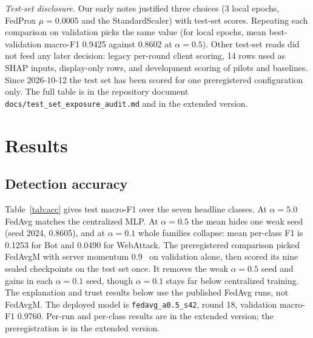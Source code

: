 \documentclass[conference]{IEEEtran}
\newif\iffullversion
\newcommand{\fullref}[1]{\iffullversion Appendix~\ref{#1}\else the extended version\fi}
\begin{document}
\emph{Test-set disclosure.} Our early notes justified three choices (3 local epochs, %
FedProx $\mu=0.0005$ and the StandardScaler) with test-set scores. Repeating each %
comparison on validation picks the same value (for local epochs, mean best-validation
macro-F1 0.9425 against 0.8602 at $\alpha=0.5$). Other test-set reads did not feed any %
later decision: legacy per-round client scoring, 14 rows used as SHAP inputs, %
display-only rows, and development scoring of pilots and baselines. Since 2026-10-12 the %
test set has been scored for one preregistered configuration only. The
full table is in the repository document \texttt{docs/test\_set\_exposure\_audit.md}
and in \fullref{app:testaudit}.

\section{Results}

\subsection{Detection accuracy}
\label{sec:r-acc}
Table~\ref{tab:acc} gives test macro-F1 over the seven headline classes. At
$\alpha=5.0$ FedAvg matches the centralized MLP. At $\alpha=0.5$ the mean hides one weak %
seed (seed 2024, 0.8605), and at $\alpha=0.1$ whole families collapse: mean per-class %
F1 is 0.1253 for Bot and 0.0490 for WebAttack. The preregistered comparison picked %
FedAvgM with server momentum 0.9~\cite{hsu2019} on validation alone, then scored its nine %
sealed checkpoints on the test set once. It removes the weak $\alpha=0.5$ seed and gains %
in each $\alpha=0.1$ seed, though $\alpha=0.1$ stays far below centralized training. %
The explanation and trust results below use the published FedAvg runs, not FedAvgM. The
deployed model is \texttt{fedavg\_a0.5\_s42}, round 18, validation macro-F1 0.9760. %
Per-run and per-class results are in \fullref{app:fedacc}; the preregistration is in
\fullref{app:prereg}.
\end{document}
